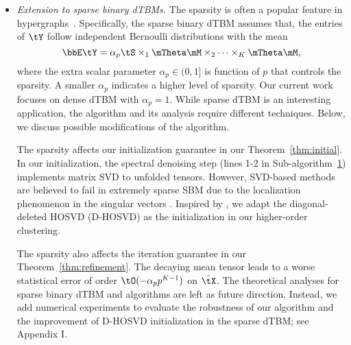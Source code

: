 \documentclass[lettersize,onecolumn,journal]{IEEEtran}
\theoremstyle{definition}
\theoremstyle{definition}
\begin{document}
{\begin{itemize}[wide]
    
  \item \textit{Extension to sparse binary dTBMs.} The sparsity is often a popular feature in hypergraphs~\citep{florescu2016spectral,ke2019community}. Specifically, the sparse binary dTBM assumes that, the entries of $\tY$ follow independent Bernoulli distributions with the mean
     \begin{equation}\label{eq:sparse_dtbm}
    \bbE\tY = \alpha_p \tS \times_1 \mTheta \mM \times_2  \cdots \times_K \mTheta \mM,
\end{equation}
where the extra scalar parameter $\alpha_p \in (0,1]$ is function of $p$ that controls the sparsity. A smaller $\alpha_p$ indicates a higher level of sparsity. Our current work focuses on dense dTBM with $\alpha_p=1$.  While sparse dTBM is an interesting application, the algorithm and its analysis require different techniques. Below, we discuss possible modifications of the algorithm. 


The sparsity affects our initialization guarantee in our Theorem~\ref{thm:initial}. In our initialization, the spectral denoising step (lines 1-2 in Sub-algorithm~\hyperref[alg:main]{1}) implements matrix SVD to unfolded tensors. %
However, SVD-based methods are believed to fail in extremely sparse SBM due to the localization phenomenon in the singular vectors \citep{florescu2016spectral}. Inspired by \cite{florescu2016spectral}, we adapt the diagonal-deleted HOSVD (D-HOSVD) \citep{ke2019community} as the initialization in our higher-order clustering. 

The sparsity also affects the iteration guarantee in our Theorem~\ref{thm:refinement}. The decaying mean tensor leads to a worse statistical error of order $\tO( -\alpha_p p^{K-1})$ on $\hat \tX$. The theoretical analyses for sparse binary dTBM and algorithms are left as future direction. Instead, we add numerical experiments to evaluate the robustness of our algorithm and the improvement of D-HOSVD initialization in the sparse dTBM; see Appendix I.



\end{itemize}}
\end{document}
